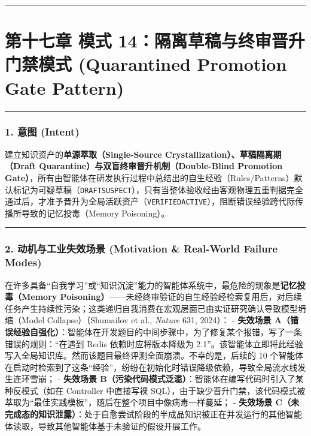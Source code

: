 \documentclass[
]{ctexart}
\renewcommand{\_}{\discretionary{}{}{\textunderscore}}
\let\oldsection\section
\renewcommand{\section}{\clearpage\oldsection}
\begin{document}
\begin{center}\rule{0.5\linewidth}{0.5pt}\end{center}

\section{第十七章 模式 14：隔离草稿与终审晋升门禁模式 (Quarantined Promotion Gate
Pattern)}\label{ux6a21ux5f0f-14ux9694ux79bbux8349ux7a3fux4e0eux7ec8ux5ba1ux664bux5347ux95e8ux7981ux6a21ux5f0f-quarantined-promotion-gate-pattern}

\begin{center}\rule{0.5\linewidth}{0.5pt}\end{center}

\subsubsection{1. 意图 (Intent)}\label{ux610fux56fe-intent-13}

建立知识资产的\textbf{单源萃取（Single-Source
Crystallization）、草稿隔离期（Draft
Quarantine）与双盲终审晋升机制（Double-Blind Promotion
Gate）}，所有由智能体在研发执行过程中总结出的自生经验（Rules/Patterns）默认标记为可疑草稿（\texttt{DRAFT\_SUSPECT}），只有当整体验收经由客观物理五重判据完全通过后，才准予晋升为全局活跃资产（\texttt{VERIFIED\_ACTIVE}），阻断错误经验跨代际传播所导致的记忆投毒（Memory
Poisoning）。

\begin{center}\rule{0.5\linewidth}{0.5pt}\end{center}

\subsubsection{2. 动机与工业失效场景 (Motivation \& Real-World Failure
Modes)}\label{ux52a8ux673aux4e0eux5de5ux4e1aux5931ux6548ux573aux666f-motivation-real-world-failure-modes-13}

在许多具备``自我学习''或``知识沉淀''能力的智能体系统中，最危险的现象是\textbf{记忆投毒（Memory
Poisoning）}------未经终审验证的自生经验经检索复用后，对后续任务产生持续性污染；这类递归自我消费在宏观层面已由实证研究确认导致模型坍缩（Model
Collapse）（Shumailov et al., \emph{Nature} 631, 2024）： -
\textbf{失效场景
A（错误经验自强化）}：智能体在开发题目的中间步骤中，为了修复某个报错，写了一条错误的规则：``在遇到
Redis 依赖时应将版本降级为
2.1''。该智能体立即将此经验写入全局知识库。然而该题目最终评测全面崩溃。不幸的是，后续的
10
个智能体在启动时检索到了这条``经验''，纷纷在初始化时错误降级依赖，导致全局流水线发生连环雪崩；
- \textbf{失效场景
B（污染代码模式泛滥）}：智能体在编写代码时引入了某种反模式（如在
Controller 中直接写裸
SQL），由于缺少晋升门禁，该代码模式被萃取为``最佳实践模板''，随后在整个项目中像病毒一样蔓延；
- \textbf{失效场景
C（未完成态的知识泄露）}：处于自愈尝试阶段的半成品知识被正在并发运行的其他智能体读取，导致其他智能体基于未验证的假设开展工作。
\end{document}
